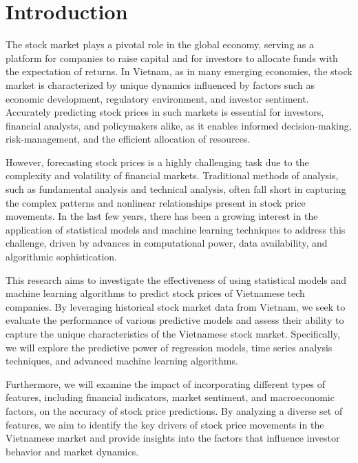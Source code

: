 \documentclass{ieeeojies}
\begin{document}
\maketitle

\section{Introduction}
\label{sec:introduction}
The stock market plays a pivotal role in the global economy, serving as a platform for companies to raise capital and for investors to allocate funds with the expectation of returns. In Vietnam, as in many emerging economies, the stock market is characterized by unique dynamics influenced by factors such as economic development, regulatory environment, and investor sentiment. Accurately predicting stock prices in such markets is essential for investors, financial analysts, and policymakers alike, as it enables informed decision-making, risk-management, and the efficient allocation of resources.

However, forecasting stock prices is a highly challenging task due to the complexity and volatility of financial markets. Traditional methods of analysis, such as fundamental analysis and technical analysis, often fall short in capturing the complex patterns and nonlinear relationships present in stock price movements. In the last few years, there has been a growing interest in the application of statistical models and machine learning techniques to address this challenge, driven by advances in computational power, data availability, and algorithmic sophistication.

This research aims to investigate the effectiveness of using statistical models and machine learning algorithms to predict stock prices of Vietnamese tech companies. By leveraging historical stock market data from Vietnam, we seek to evaluate the performance of various predictive models and assess their ability to capture the unique characteristics of the Vietnamese stock market. Specifically, we will explore the predictive power of regression models, time series analysis techniques, and advanced machine learning algorithms.

Furthermore, we will examine the impact of incorporating different types of features, including financial indicators, market sentiment, and macroeconomic factors, on the accuracy of stock price predictions. By analyzing a diverse set of features, we aim to identify the key drivers of stock price movements in the Vietnamese market and provide insights into the factors that influence investor behavior and market dynamics.
\end{document}
